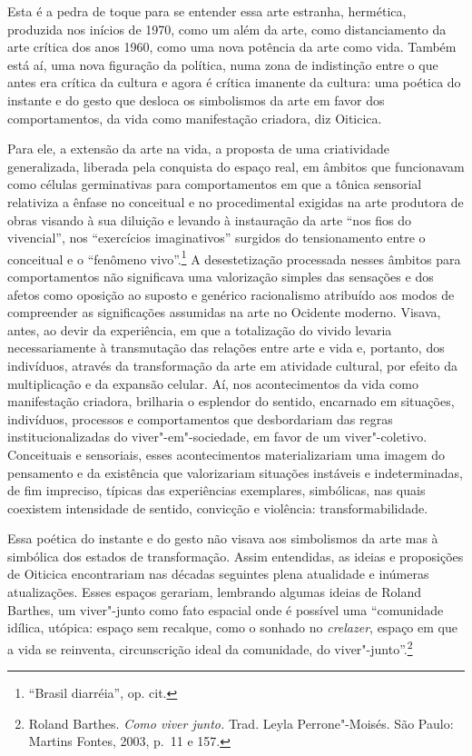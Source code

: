Esta é a pedra de toque para se entender essa arte estranha, hermética,
produzida nos inícios de 1970, como um além da arte, como distanciamento
da arte crítica dos anos 1960, como uma nova potência da arte como vida.
Também está aí, uma nova figuração da política, numa zona de indistinção
entre o que antes era crítica da cultura e agora é crítica imanente da
cultura: uma poética do instante e do gesto que desloca os simbolismos
da arte em favor dos comportamentos, da vida como manifestação criadora,
diz Oiticica.

Para ele, a extensão da arte na vida, a proposta de uma criatividade
generalizada, liberada pela conquista do espaço real, em âmbitos que
funcionavam como células germinativas para comportamentos em que a
tônica sensorial relativiza a ênfase no conceitual e no procedimental
exigidas na arte produtora de obras visando à sua diluição e levando à
instauração da arte ``nos fios do vivencial'', nos ``exercícios
imaginativos'' surgidos do tensionamento entre o conceitual e o
``fenômeno vivo''.\footnote{``Brasil diarréia'', op. cit.} A
desestetização processada nesses âmbitos para comportamentos não
significava uma valorização simples das sensações e dos afetos como
oposição ao suposto e genérico racionalismo atribuído aos modos de
compreender as significações assumidas na arte no Ocidente moderno.
Visava, antes, ao devir da experiência, em que a totalização do vivido
levaria necessariamente à transmutação das relações entre arte e vida e,
portanto, dos indivíduos, através da transformação da arte em atividade
cultural, por efeito da multiplicação e da expansão celular. Aí, nos
acontecimentos da vida como manifestação criadora, brilharia o esplendor
do sentido, encarnado em situações, indivíduos, processos e
comportamentos que desbordariam das regras institucionalizadas do
viver"-em"-sociedade, em favor de um viver"-coletivo. Conceituais e
sensoriais, esses acontecimentos materializariam uma imagem do
pensamento e da existência que valorizariam situações instáveis e
indeterminadas, de fim impreciso, típicas das experiências exemplares,
simbólicas, nas quais coexistem intensidade de sentido, convicção e
violência: transformabilidade.

Essa poética do instante e do gesto não visava aos simbolismos da arte
mas à simbólica dos estados de transformação. Assim entendidas, as
ideias e proposições de Oiticica encontrariam nas décadas seguintes
plena atualidade e inúmeras atualizações. Esses espaços gerariam,
lembrando algumas ideias de Roland Barthes, um viver"-junto como fato
espacial onde é possível uma ``comunidade idílica, utópica: espaço sem
recalque, como o sonhado no \emph{crelazer}, espaço em que a vida se
reinventa, circunscrição ideal da comunidade, do viver"-junto''.\footnote{Roland
  Barthes. \emph{Como viver junto.} Trad. Leyla Perrone"-Moisés. São
  Paulo: Martins Fontes, 2003, p.~11 e 157.}

